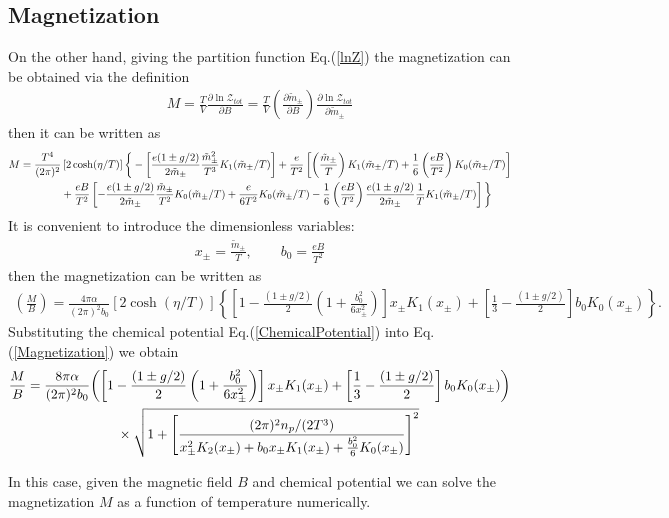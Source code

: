 \documentclass[Universe,article,submit,moreauthors,pdftex]{Definitions/mdpi}
\begin{document}
\subsection{Magnetization}
On the other hand, giving the partition function Eq.(\ref{lnZ}) the magnetization can be obtained via the definition
\begin{align}
M=\frac{T}{V}\frac{\partial \ln\mathcal{Z}_{tot}}{\partial B}=\frac{T}{V}\left(\frac{\partial\tilde m_\pm}{\partial B}\right)\frac{\partial \ln\mathcal{Z}_{tot}}{\partial\tilde m_\pm}
\end{align}
then it can be written as
\begin{align}
M=\frac{T^4}{(2\pi)^2}&\left[2\cosh(\eta/T)\right]
\bigg\{-\left[\frac{e(1\pm g/2)}{2\tilde m_\pm}\frac{\tilde m_\pm^2}{T^3}K_1(\tilde m_\pm/T)\right]+\frac{e}{T^2} \left[\left(\frac{\tilde m_\pm}{T}\right)K_1(\tilde m_\pm/T)+\frac{1}{6}\left(\frac{eB}{T^2}\right)K_0(\tilde m_\pm/T)\right]\notag\\
&+\frac{eB}{T^2} \left[-\frac{e(1\pm g/2)}{2\tilde m_\pm}\frac{\tilde m_\pm}{T^2}K_0(\tilde m_\pm/T)+\frac{e}{6T^2}K_0(\tilde m_\pm/T)-\frac{1}{6}\left(\frac{eB}{T^2}\right)\frac{e(1\pm g/2)}{2\tilde m_\pm}\frac{1}{T}K_1(\tilde m_\pm/T)\right]\bigg\}
\end{align}
It is convenient to introduce the dimensionless variables:
\begin{align}
x_\pm=\frac{\tilde m_\pm}{T},\qquad b_0=\frac{eB}{T^2}
\end{align}
then the magnetization can be written as
\begin{align}\label{Magnetization}
\left(\frac{M}{B}\right)=\frac{4\pi\alpha}{(2\pi)^2b_0}\left[2\cosh(\eta/T)\right]\left\{\left[1-\frac{(1\pm g/2)}{2}\left(1+\frac{b^2_0}{6x^2_\pm}\right)\right]x_\pm K_1(x_\pm)+\left[\frac{1}{3}-\frac{(1\pm g/2)}{2}\right]b_0K_0(x_\pm)\right\}.
\end{align}
Substituting the chemical potential Eq.(\ref{ChemicalPotential}) into Eq.(\ref{Magnetization}) we obtain
\begin{align}
\frac{M}{B}=\frac{8\pi\alpha}{(2\pi)^2b_0}&{\left(\left[1-\frac{(1\pm g/2)}{2}\left(1+\frac{b^2_0}{6x^2_\pm}\right)\right]x_\pm K_1(x_\pm)+\left[\frac{1}{3}-\frac{(1\pm g/2)}{2}\right]b_0K_0(x_\pm)\right)}\notag\\
&\qquad\times\sqrt{1+\left[\frac{{(2\pi)^2n_p}/{(2T^3)}}{x_\pm^2K_2(x_\pm)+b_0x_\pm K_1(x_\pm)+\frac{b^2_0}{6}K_0(x_\pm)}\right]^2}
\end{align}


In this case, given the magnetic field $B$ and chemical potential we can solve the magnetization $M$ as a function of temperature numerically.
\end{document}
